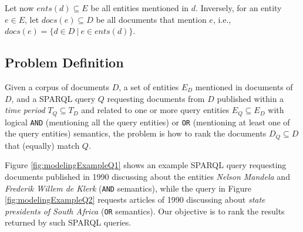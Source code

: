Let now  $ents(d) \subseteq E$ be all entities mentioned in $d$.
Inversely, for an entity $e \in E$, let $docs(e) \subseteq D$
be all documents that mention $e$, i.e., $docs(e) = \{d \in D ~|~ e \in ents(d)\}$.




\subsection{Problem Definition}
Given a corpus of documents $D$,
a set of entities $E_D$ mentioned in documents of $D$,
and a SPARQL query $Q$ requesting documents from $D$
published within a {\em time period} $T_Q \subseteq T_D$ and
related to one or more query entities $E_Q \subseteq E_D$
with logical {\tt AND} (mentioning all the query entities) or {\tt OR} (mentioning at least one of the query entities) semantics,
the problem is how to rank the documents $D_Q \subseteq D$ that (equally) match $Q$.

Figure \ref{fig:modelingExampleQ1} shows an example SPARQL query
requesting documents published in 1990
discussing about the entities {\em Nelson Mandela} %
and {\em Frederik Willem de Klerk} %
({\tt AND} semantics),
while the query in Figure \ref{fig:modelingExampleQ2} requests
articles of 1990 discussing about {\em state presidents of South Africa}
({\tt OR} semantics).
Our objective is to rank the results returned by such SPARQL queries.


